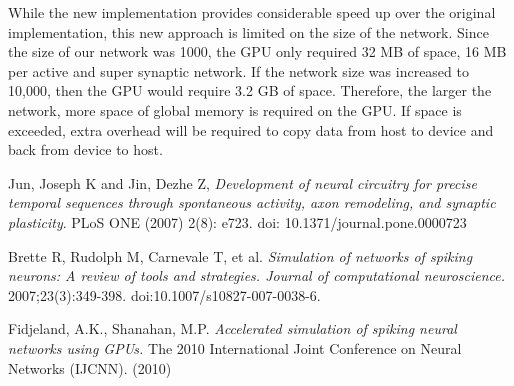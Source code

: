 \documentclass[a4paper]{article}
\begin{document}
While the new implementation provides considerable speed up over the original implementation, this new approach is limited on the size of the network. Since the size of our network was 1000, the GPU only required 32 MB of space, 16 MB per active and super synaptic network. If the network size was increased to 10,000, then the GPU would require 3.2 GB of space. Therefore, the larger the network, more space of global memory is required on the GPU. If space is exceeded, extra overhead will be required to copy data from host to device and back from device to host.


\begin{thebibliography}{9}
Jun, Joseph K and Jin, Dezhe Z,
\emph{Development of neural circuitry for precise temporal sequences through spontaneous activity, axon remodeling, and synaptic plasticity}.
PLoS ONE (2007) 2(8): e723. doi: 10.1371/journal.pone.0000723

Brette R, Rudolph M, Carnevale T, et al.
\emph{Simulation of networks of spiking neurons: A review of tools and strategies. Journal of computational neuroscience.}
2007;23(3):349-398. doi:10.1007/s10827-007-0038-6.

Fidjeland, A.K.,  Shanahan, M.P.
\emph{Accelerated simulation of spiking neural networks using GPUs.}
The 2010 International Joint Conference on Neural Networks (IJCNN). (2010)
\end{thebibliography}
\end{document}
